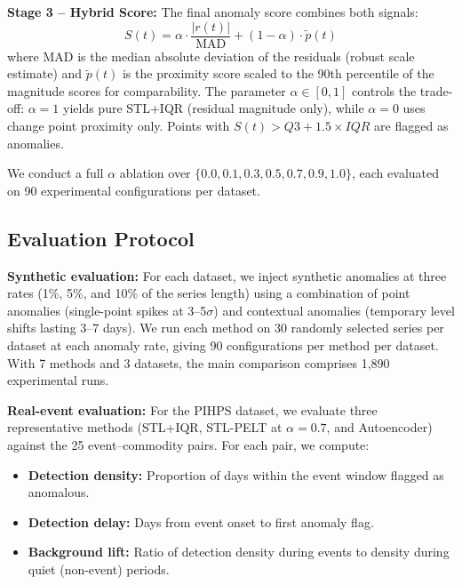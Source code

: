 \documentclass[10pt]{article}
\begin{document}
\textbf{Stage 3 -- Hybrid Score:} The final anomaly score combines both signals:
\begin{equation}
S(t) = \alpha \cdot \frac{|r(t)|}{\text{MAD}} + (1 - \alpha) \cdot \tilde{p}(t)
\end{equation}
where MAD is the median absolute deviation of the residuals (robust scale estimate) and $\tilde{p}(t)$ is the proximity score scaled to the 90th percentile of the magnitude scores for comparability. The parameter $\alpha \in [0,1]$ controls the trade-off: $\alpha=1$ yields pure STL+IQR (residual magnitude only), while $\alpha=0$ uses change point proximity only. Points with $S(t) > Q3 + 1.5 \times IQR$ are flagged as anomalies.

We conduct a full $\alpha$ ablation over $\{0.0,\allowbreak 0.1,\allowbreak 0.3,\allowbreak 0.5,\allowbreak 0.7,\allowbreak 0.9,\allowbreak 1.0\}$, each evaluated on 90 experimental configurations per dataset.

\subsection{Evaluation Protocol}

\noindent\textbf{Synthetic evaluation:} For each dataset, we inject synthetic anomalies at three rates (1\%, 5\%, and 10\% of the series length) using a combination of point anomalies (single-point spikes at 3--5$\sigma$) and contextual anomalies (temporary level shifts lasting 3--7 days). We run each method on 30 randomly selected series per dataset at each anomaly rate, giving 90 configurations per method per dataset. With 7 methods and 3 datasets, the main comparison comprises 1,890 experimental runs.

\noindent\textbf{Real-event evaluation:} For the PIHPS dataset, we evaluate three representative methods (STL+IQR, STL-PELT at $\alpha=0.7$, and Autoencoder) against the 25 event--commodity pairs. For each pair, we compute:
\begin{itemize}[leftmargin=*,nosep]
    \item \textbf{Detection density:} Proportion of days within the event window flagged as anomalous.
    \item \textbf{Detection delay:} Days from event onset to first anomaly flag.
    \item \textbf{Background lift:} Ratio of detection density during events to density during quiet (non-event) periods.
\end{itemize}
\end{document}
